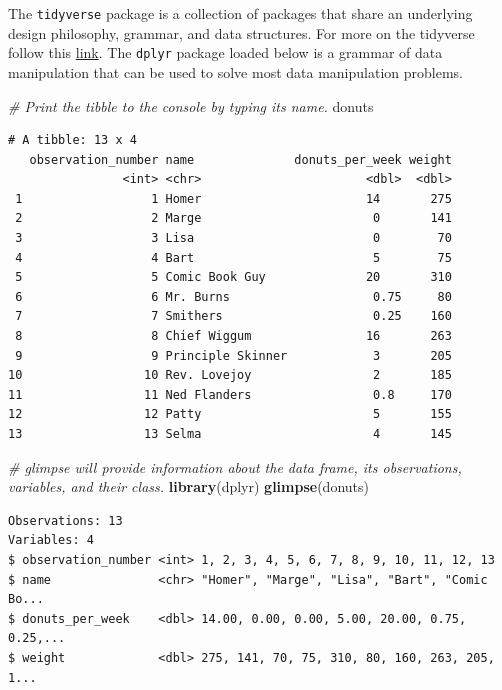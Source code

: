 \documentclass[]{book}
\newenvironment{Shaded}{\begin{snugshade}}{\end{snugshade}}
\newcommand{\CommentTok}[1]{\textcolor[rgb]{0.56,0.35,0.01}{\textit{#1}}}
\newcommand{\KeywordTok}[1]{\textcolor[rgb]{0.13,0.29,0.53}{\textbf{#1}}}
\newcommand{\NormalTok}[1]{#1}
\begin{document}
The \texttt{tidyverse} package is a collection of packages that share an underlying design philosophy, grammar, and data structures. For more on the tidyverse follow this \href{https://www.tidyverse.org}{link}. The \texttt{dplyr} package loaded below is a grammar of data manipulation that can be used to solve most data manipulation problems.

\begin{Shaded}
\begin{Highlighting}[]
\CommentTok{# Print the tibble to the console by typing its name.}
\NormalTok{donuts}
\end{Highlighting}
\end{Shaded}

\begin{verbatim}
# A tibble: 13 x 4
   observation_number name              donuts_per_week weight
                <int> <chr>                       <dbl>  <dbl>
 1                  1 Homer                       14       275
 2                  2 Marge                        0       141
 3                  3 Lisa                         0        70
 4                  4 Bart                         5        75
 5                  5 Comic Book Guy              20       310
 6                  6 Mr. Burns                    0.75     80
 7                  7 Smithers                     0.25    160
 8                  8 Chief Wiggum                16       263
 9                  9 Principle Skinner            3       205
10                 10 Rev. Lovejoy                 2       185
11                 11 Ned Flanders                 0.8     170
12                 12 Patty                        5       155
13                 13 Selma                        4       145
\end{verbatim}

\begin{Shaded}
\begin{Highlighting}[]
\CommentTok{# glimpse will provide information about the data frame, its observations, variables, and their class.}
\KeywordTok{library}\NormalTok{(dplyr)}
\KeywordTok{glimpse}\NormalTok{(donuts)}
\end{Highlighting}
\end{Shaded}

\begin{verbatim}
Observations: 13
Variables: 4
$ observation_number <int> 1, 2, 3, 4, 5, 6, 7, 8, 9, 10, 11, 12, 13
$ name               <chr> "Homer", "Marge", "Lisa", "Bart", "Comic Bo...
$ donuts_per_week    <dbl> 14.00, 0.00, 0.00, 5.00, 20.00, 0.75, 0.25,...
$ weight             <dbl> 275, 141, 70, 75, 310, 80, 160, 263, 205, 1...
\end{verbatim}
\end{document}
